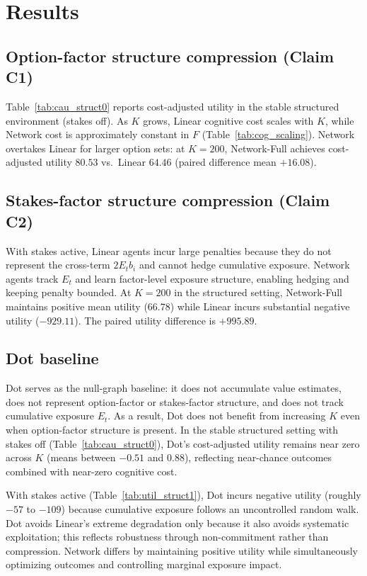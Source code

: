\documentclass[11pt]{article}
\begin{document}
\section{Results}

\subsection{Option-factor structure compression (Claim C1)}

Table~\ref{tab:cau_struct0} reports cost-adjusted utility in the stable structured environment (stakes off). As $K$ grows, Linear cognitive cost scales with $K$, while Network cost is approximately constant in $F$ (Table~\ref{tab:cog_scaling}). Network overtakes Linear for larger option sets: at $K=200$, Network-Full achieves cost-adjusted utility $80.53$ vs.\ Linear $64.46$ (paired difference mean $+16.08$).

\subsection{Stakes-factor structure compression (Claim C2)}

With stakes active, Linear agents incur large penalties because they do not represent the cross-term $2E_tb_i$ and cannot hedge cumulative exposure. Network agents track $E_t$ and learn factor-level exposure structure, enabling hedging and keeping penalty bounded. At $K=200$ in the structured setting, Network-Full maintains positive mean utility ($66.78$) while Linear incurs substantial negative utility ($-929.11$). The paired utility difference is $+995.89$.


\subsection{Dot baseline}

Dot serves as the null-graph baseline: it does not accumulate value estimates, does not represent option-factor or stakes-factor structure, and does not track cumulative exposure $E_t$. As a result, Dot does not benefit from increasing $K$ even when option-factor structure is present. In the stable structured setting with stakes off (Table~\ref{tab:cau_struct0}), Dot's cost-adjusted utility remains near zero across $K$ (means between $-0.51$ and $0.88$), reflecting near-chance outcomes combined with near-zero cognitive cost.

With stakes active (Table~\ref{tab:util_struct1}), Dot incurs negative utility (roughly $-57$ to $-109$) because cumulative exposure follows an uncontrolled random walk. Dot avoids Linear's extreme degradation only because it also avoids systematic exploitation; this reflects robustness through non-commitment rather than compression. Network differs by maintaining positive utility while simultaneously optimizing outcomes and controlling marginal exposure impact.
\end{document}
